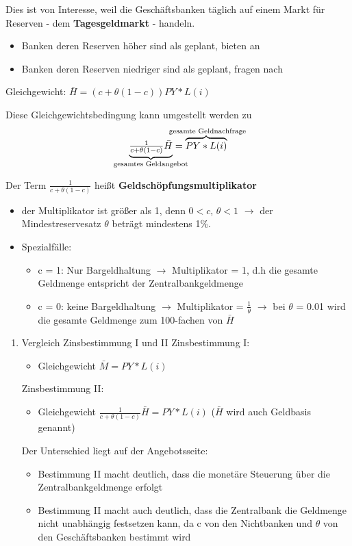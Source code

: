 \documentclass[11pt]{article}
\begin{document}
Dies ist von Interesse, weil die Geschäftsbanken täglich auf einem Markt für Reserven - dem \textbf{Tagesgeldmarkt} - handeln.
\begin{itemize}
\item Banken deren Reserven höher sind als geplant, bieten an
\item Banken deren Reserven niedriger sind als geplant, fragen nach
\end{itemize}

Gleichgewicht: \(\bar{H} = (c + \theta(1-c)) PY * L(i)\)

Diese Gleichgewichtsbedingung kann umgestellt werden zu
\begin{equation*}
\begin{aligned}
{\underbrace{\textstyle \frac{1}{c+\theta(1-c)} \bar{H}}_{\mathclap{\text{gesamtes Geldangebot}}}} = {\overbrace{\textstyle PY*L(i)}^{\mathclap{\text{ gesamte Geldnachfrage}}}}
\end{aligned}
\end{equation*}

Der Term \(\frac{1}{c+\theta(1-c)}\) heißt \textbf{Geldschöpfungsmultiplikator}
\begin{itemize}
\item der Multiplikator ist größer als 1, denn \(0<c\), \(\theta<1\) \(\rightarrow\) der Mindestreservesatz \(\theta\) beträgt mindestens 1\%.
\item Spezialfälle:
\begin{itemize}
\item c = 1: Nur Bargeldhaltung \(\rightarrow\) Multiplikator = 1, d.h die gesamte Geldmenge entspricht der Zentralbankgeldmenge
\item c = 0: keine Bargeldhaltung \(\rightarrow\) Multiplikator = \(\frac{1}{\theta}\) \(\rightarrow\) bei \(\theta\) = 0.01 wird die gesamte Geldmenge zum 100-fachen von \(\bar{H}\)
\end{itemize}
\end{itemize}

\begin{enumerate}
\item Vergleich Zinsbestimmung I und II
\label{sec:orged99511}
Zinsbestimmung I:
\begin{itemize}
\item Gleichgewicht \(\bar{M} = PY * L(i)\)
\end{itemize}

Zinsbestimmung II:
\begin{itemize}
\item Gleichgewicht \(\frac{1}{c+\theta (1-c)}\bar{H} = PY * L(i)\) (\(\bar{H}\) wird auch Geldbasis genannt)
\end{itemize}

Der Unterschied liegt auf der Angebotsseite:
\begin{itemize}
\item Bestimmung II macht deutlich, dass die monetäre Steuerung über die Zentralbankgeldmenge erfolgt
\item Bestimmung II macht auch deutlich, dass die Zentralbank die Geldmenge nicht unabhängig festsetzen kann, da c von den Nichtbanken und \(\theta\) von den Geschäftsbanken bestimmt wird
\end{itemize}
\end{enumerate}
\end{document}
